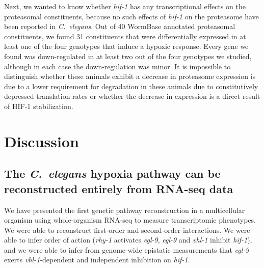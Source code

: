 \documentclass[9pt,twocolumn,twoside]{pnas-new}
\newcommand{\cel}{\emph{C.~elegans}}
\newcommand{\egl}{\emph{egl-9}}
\newcommand{\rhy}{\emph{rhy-1}}
\newcommand{\vhl}{\emph{vhl-1}}
\newcommand{\hif}{\emph{hif-1}}
\newcommand{\hifp}{HIF-1}
\begin{document}
Next, we wanted to know whether \hif{} has any transcriptional effects on the
proteasomal constituents, because no such effects of \hif{} on the proteasome
have been reported in \cel{}. Out of 40 WormBase annotated proteasomal constituents,
we found 31 constituents that were differentially expressed in at least one of the
four genotypes that induce a hypoxic response. Every gene we found was down-regulated
in at least two out of the four genotypes we studied, although in each case the
down-regulation was minor. It is impossible to distinguish whether these animals
exhibit a decrease in proteasome expression is due to a lower requirement for
degradation in these animals due to constitutively depressed translation rates or
whether the decrease in expression is a direct result of \hifp{} stabilization.



\section*{Discussion}
\subsection*{The \cel{} hypoxia pathway can be reconstructed entirely from
             RNA-seq data}
We have presented the first genetic pathway reconstruction in a multicellular
organism using whole-organism RNA-seq to measure transcriptomic phenotypes.
We were able to reconstruct first-order and second-order interactions. We
were able to infer order of action (\rhy{} activates \egl{}, \egl{} and
\vhl{} inhibit \hif{}), and we were able to infer from genome-wide epistatic
measurements that \egl{} exerts \vhl{}-dependent and independent inhibition on
\hif{}.
\end{document}
